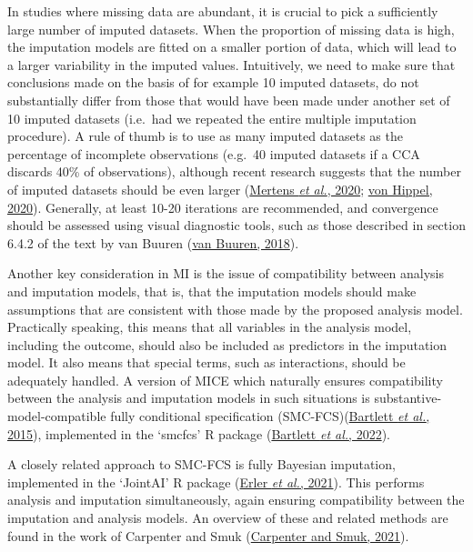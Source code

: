 \documentclass[
  letterpaper,
  DIV=11,
  numbers=noendperiod]{scrreprt}
\begin{document}
In studies where missing data are abundant, it is crucial to pick a
sufficiently large number of imputed datasets. When the proportion of
missing data is high, the imputation models are fitted on a smaller
portion of data, which will lead to a larger variability in the imputed
values. Intuitively, we need to make sure that conclusions made on the
basis of for example 10 imputed datasets, do not substantially differ
from those that would have been made under another set of 10 imputed
datasets (i.e.~had we repeated the entire multiple imputation
procedure). A rule of thumb is to use as many imputed datasets as the
percentage of incomplete observations (e.g.~40 imputed datasets if a CCA
discards 40\% of observations), although recent research suggests that
the number of imputed datasets should be even larger
(\protect\hyperlink{ref-mertensConstructionAssessmentPrediction2020}{Mertens
\emph{et al.}, 2020};
\protect\hyperlink{ref-vonhippelHowManyImputations2020}{von Hippel,
2020}). Generally, at least 10-20 iterations are recommended, and
convergence should be assessed using visual diagnostic tools, such as
those described in section 6.4.2 of the text by van Buuren
(\protect\hyperlink{ref-buurenFlexibleImputationMissing2018}{van Buuren,
2018}).

Another key consideration in MI is the issue of compatibility between
analysis and imputation models, that is, that the imputation models
should make assumptions that are consistent with those made by the
proposed analysis model. Practically speaking, this means that all
variables in the analysis model, including the outcome, should also be
included as predictors in the imputation model. It also means that
special terms, such as interactions, should be adequately handled. A
version of MICE which naturally ensures compatibility between the
analysis and imputation models in such situations is
substantive-model-compatible fully conditional specification
(SMC-FCS)(\protect\hyperlink{ref-bartlettMultipleImputationCovariates2015}{Bartlett
\emph{et al.}, 2015}), implemented in the `smcfcs' R package
(\protect\hyperlink{ref-bartlettSmcfcsMultipleImputation2022}{Bartlett
\emph{et al.}, 2022}).

A closely related approach to SMC-FCS is fully Bayesian imputation,
implemented in the `JointAI' R package
(\protect\hyperlink{ref-erlerJointAIJointAnalysis2021}{Erler \emph{et
al.}, 2021}). This performs analysis and imputation simultaneously,
again ensuring compatibility between the imputation and analysis models.
An overview of these and related methods are found in the work of
Carpenter and Smuk
(\protect\hyperlink{ref-carpenterMissingDataStatistical2021}{Carpenter
and Smuk, 2021}).
\end{document}
